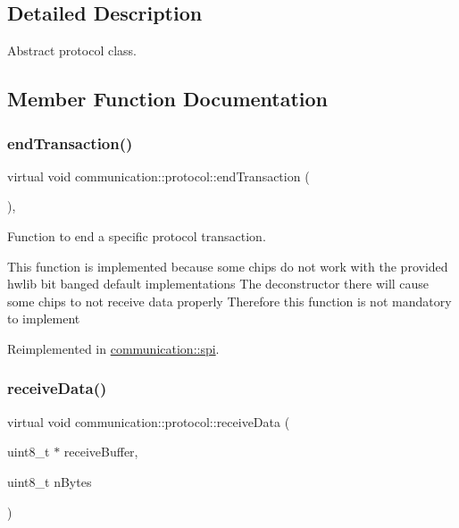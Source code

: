 \subsection{Detailed Description}
Abstract protocol class. 

\subsection{Member Function Documentation}
\mbox{\label{classcommunication_1_1protocol_a09be73a92665c2adb539d20b754ce19c}} 
\subsubsection{\texorpdfstring{end\+Transaction()}{endTransaction()}}
{\footnotesize\ttfamily virtual void communication\+::protocol\+::end\+Transaction (\begin{DoxyParamCaption}{ }\end{DoxyParamCaption})\hspace{0.3cm}{\ttfamily [inline]}, {\ttfamily [virtual]}}



Function to end a specific protocol transaction. 

This function is implemented because some chips do not work with the provided hwlib bit banged default implementations The deconstructor there will cause some chips to not receive data properly Therefore this function is not mandatory to implement 

Reimplemented in \hyperlink{classcommunication_1_1spi_a9d10ed759010fef5c687b4f8e63a14f6}{communication\+::spi}.

\mbox{\label{classcommunication_1_1protocol_ad0d43530ae3db2b14a6e9c1f77aa530a}} 
\subsubsection{\texorpdfstring{receive\+Data()}{receiveData()}}
{\footnotesize\ttfamily virtual void communication\+::protocol\+::receive\+Data (\begin{DoxyParamCaption}\item[{uint8\+\_\+t $\ast$}]{receive\+Buffer,  }\item[{uint8\+\_\+t}]{n\+Bytes }\end{DoxyParamCaption})\hspace{0.3cm}{\ttfamily [pure virtual]}}



